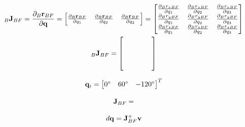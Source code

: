 \begin{gather}\label{eq:J_BF_inB}
	_B \mathbf{J}_{BF} = \frac{\partial _B \mathbf{r}_{BF}}{\partial \mathbf{q}} = \begin{bmatrix}
		\frac{\partial _B \mathbf{r}_{BF}}{\partial q_1} & \frac{\partial_B \mathbf{r}_{BF}}{\partial q_2} & \frac{\partial _B \mathbf{r}_{BF}}{\partial q_3}\end{bmatrix} = \begin{bmatrix}
		\frac{\partial _B r_{xBF}}{\partial q_1} & \frac{\partial_B r_{xBF}}{\partial q_2} & \frac{\partial _B r_{xBF}}{\partial q_3} \\
		\frac{\partial _B r_{yBF}}{\partial q_1} & \frac{\partial_B r_{yBF}}{\partial q_2} & \frac{\partial _B r_{yBF}}{\partial q_3} \\
		\frac{\partial _B r_{zBF}}{\partial q_1} & \frac{\partial_B r_{zBF}}{\partial q_2} & \frac{\partial _B r_{zBF}}{\partial q_3} 
	\end{bmatrix} \\
	_B \mathbf{J}_{BF} = \begin{bmatrix}
		&  &  &  & \\
		&  &  &  & \\
		&  &  &  & \\
		&  &  &  &
	\end{bmatrix}
\end{gather}

\begin{equation}\label{eq:qi}
	\mathbf{q}_i = \begin{bmatrix}
		0^\circ & 60^\circ & -120^\circ
	\end{bmatrix}^T
\end{equation}

\begin{equation}\label{eq:JBF}
	\mathbf{J}_{BF} = 
\end{equation}

\begin{equation}\label{eq:dq}
	d\mathbf{q} = \mathbf{J}_{BF}^+ \mathbf{v}
\end{equation}





\section{}





\section{}
